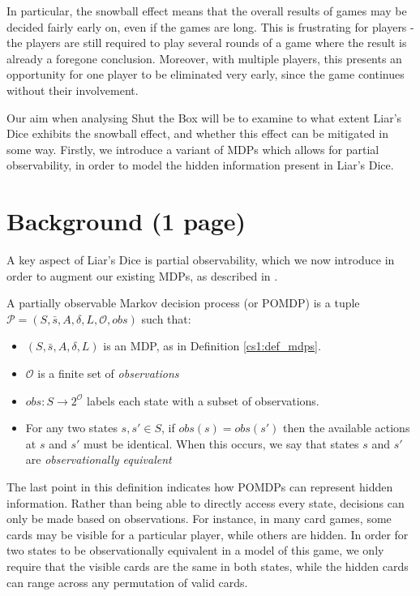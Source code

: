 In particular, the snowball effect means that the overall results of games may be decided fairly early on, even if the games are long. This is frustrating for players - the players are still required to play several rounds of a game where the result is already a foregone conclusion. Moreover, with multiple players, this presents an opportunity for one player to be eliminated very early, since the game continues without their involvement.

Our aim when analysing Shut the Box will be to examine to what extent Liar's Dice exhibits the snowball effect, and whether this effect can be mitigated in some way. Firstly, we introduce a variant of MDPs which allows for partial observability, in order to model the hidden information present in Liar's Dice.

\section{Background (1 page)}

A key aspect of Liar's Dice is partial observability, which we now introduce in order to augment our existing MDPs, as described in \cite{norman_verification_2017}.

\begin{definition}
    \label{cs2:def-pomdps}

    A partially observable Markov decision process (or POMDP) is a tuple $\mathcal{P} = (S, \bar{s}, A, \delta, L, \mathcal{O}, obs)$ such that:

    \begin{itemize}
        \item $(S, \bar{s}, A, \delta, L)$ is an MDP, as in Definition \ref{cs1:def_mdps}.
        \item $\mathcal{O}$ is a finite set of \emph{observations}
        \item $obs : S \rightarrow 2^{\mathcal{O}}$ labels each state with a subset of observations.
        \item For any two states $s, s' \in S$, if $obs(s) = obs(s')$ then the available actions at $s$ and $s'$ must be identical. When this occurs, we say that states $s$ and $s'$ are \emph{observationally equivalent}
    \end{itemize}
\end{definition}

The last point in this definition indicates how POMDPs can represent hidden information. Rather than being able to directly access every state, decisions can only be made based on observations. For instance, in many card games, some cards may be visible for a particular player, while others are hidden. In order for two states to be observationally equivalent in a model of this game, we only require that the visible cards are the same in both states, while the hidden cards can range across any permutation of valid cards.

